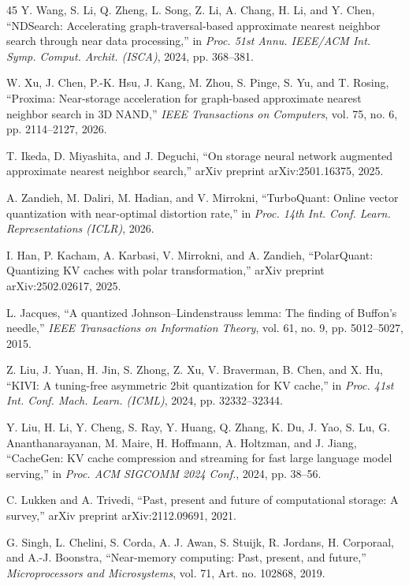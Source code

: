 \begin{thebibliography}{45}
Y. Wang, S. Li, Q. Zheng, L. Song, Z. Li, A. Chang, H. Li, and Y. Chen, ``NDSearch: Accelerating graph-traversal-based approximate nearest neighbor search through near data processing,'' in \emph{Proc. 51st Annu. IEEE/ACM Int. Symp. Comput. Archit. (ISCA)}, 2024, pp. 368--381.

W. Xu, J. Chen, P.-K. Hsu, J. Kang, M. Zhou, S. Pinge, S. Yu, and T. Rosing, ``Proxima: Near-storage acceleration for graph-based approximate nearest neighbor search in 3D NAND,'' \emph{IEEE Transactions on Computers}, vol. 75, no. 6, pp. 2114--2127, 2026.

T. Ikeda, D. Miyashita, and J. Deguchi, ``On storage neural network augmented approximate nearest neighbor search,'' arXiv preprint arXiv:2501.16375, 2025.

A. Zandieh, M. Daliri, M. Hadian, and V. Mirrokni, ``TurboQuant: Online vector quantization with near-optimal distortion rate,'' in \emph{Proc. 14th Int. Conf. Learn. Representations (ICLR)}, 2026.

I. Han, P. Kacham, A. Karbasi, V. Mirrokni, and A. Zandieh, ``PolarQuant: Quantizing KV caches with polar transformation,'' arXiv preprint arXiv:2502.02617, 2025.

L. Jacques, ``A quantized Johnson--Lindenstrauss lemma: The finding of Buffon's needle,'' \emph{IEEE Transactions on Information Theory}, vol. 61, no. 9, pp. 5012--5027, 2015.

Z. Liu, J. Yuan, H. Jin, S. Zhong, Z. Xu, V. Braverman, B. Chen, and X. Hu, ``KIVI: A tuning-free asymmetric 2bit quantization for KV cache,'' in \emph{Proc. 41st Int. Conf. Mach. Learn. (ICML)}, 2024, pp. 32332--32344.

Y. Liu, H. Li, Y. Cheng, S. Ray, Y. Huang, Q. Zhang, K. Du, J. Yao, S. Lu, G. Ananthanarayanan, M. Maire, H. Hoffmann, A. Holtzman, and J. Jiang, ``CacheGen: KV cache compression and streaming for fast large language model serving,'' in \emph{Proc. ACM SIGCOMM 2024 Conf.}, 2024, pp. 38--56.

C. Lukken and A. Trivedi, ``Past, present and future of computational storage: A survey,'' arXiv preprint arXiv:2112.09691, 2021.

G. Singh, L. Chelini, S. Corda, A. J. Awan, S. Stuijk, R. Jordans, H. Corporaal, and A.-J. Boonstra, ``Near-memory computing: Past, present, and future,'' \emph{Microprocessors and Microsystems}, vol. 71, Art. no. 102868, 2019.


\end{thebibliography}
